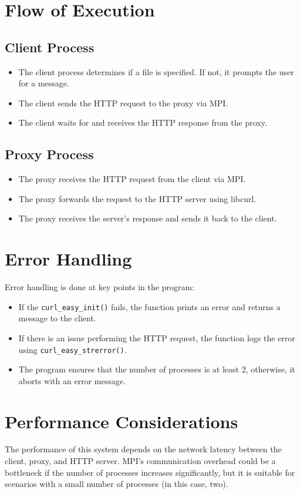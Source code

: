 \documentclass[a4paper,12pt]{article}
\begin{document}
\section{Flow of Execution}
\subsection{Client Process}
\begin{itemize}
    \item The client process determines if a file is specified. If not, it prompts the user for a message.
    \item The client sends the HTTP request to the proxy via MPI.
    \item The client waits for and receives the HTTP response from the proxy.
\end{itemize}

\subsection{Proxy Process}
\begin{itemize}
    \item The proxy receives the HTTP request from the client via MPI.
    \item The proxy forwards the request to the HTTP server using libcurl.
    \item The proxy receives the server's response and sends it back to the client.
\end{itemize}

\section{Error Handling}
Error handling is done at key points in the program:
\begin{itemize}
    \item If the \texttt{curl\_easy\_init()} fails, the function prints an error and returns a message to the client.
    \item If there is an issue performing the HTTP request, the function logs the error using \texttt{curl\_easy\_strerror()}.
    \item The program ensures that the number of processes is at least 2, otherwise, it aborts with an error message.
\end{itemize}

\section{Performance Considerations}
The performance of this system depends on the network latency between the client, proxy, and HTTP server. MPI's communication overhead could be a bottleneck if the number of processes increases significantly, but it is suitable for scenarios with a small number of processes (in this case, two).
\end{document}
